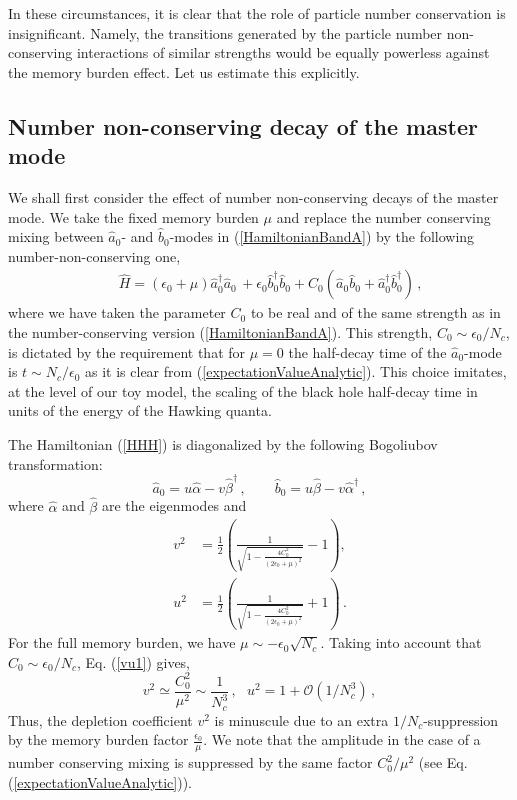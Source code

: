 \documentclass[aps,prd,reprint,superscriptaddress,nofootinbib]{revtex4-2}
\makeatletter
\newcommand*{\Eq}{Eq.\@\xspace}
\makeatother
\begin{document}
In these circumstances, it is clear that the role of 
particle number conservation is insignificant. 
Namely, the transitions generated by the 
particle number non-conserving interactions of similar strengths 
would be equally 
powerless against the memory burden effect.  Let us
estimate this explicitly. \\

\subsection{Number non-conserving decay of the master mode} 

We shall first consider the effect of number non-conserving decays 
of the master mode. 
We take the fixed memory burden $\mu$ and replace the 
number conserving mixing between 
$\hat{a}_0$- and $\hat{b}_0$-modes in (\ref{HamiltonianBandA}) by the following 
number-non-conserving one,   
\begin{eqnarray}  \label{HHH} 
&&\hat{H}  = 
(\epsilon_0 + \mu) \hat{a}^{\dagger}_0 \hat{a}_0  \, + 
\epsilon_0 \hat{b}^{\dagger}_0 \hat{b}_0  + 
C_0 (\hat{a}_0 \hat{b}_0  + \hat{a}_0^{\dagger} \hat{b}_0^{\dagger})\, , 
\end{eqnarray}
where we have taken the parameter $C_0$ to be 
real and of the same strength as in the number-conserving version
(\ref{HamiltonianBandA}).  This strength, 
$C_0 \sim \epsilon_0/N_c$, is dictated by the requirement 
that for $\mu=0$ the half-decay time of the $\hat{a}_0$-mode is 
$t \sim N_c/\epsilon_0$  as it is clear from (\ref{expectationValueAnalytic}). 
This choice imitates, at the level of our toy model,  the scaling of the black hole  half-decay time  in units of the energy of the Hawking quanta.

The Hamiltonian (\ref{HHH}) is diagonalized by the following Bogoliubov transformation:
\begin{equation} 
\hat{a}_0 = u \hat{\alpha} - v \hat{\beta}^{\dagger} \,, \qquad 
\hat{b}_0 =  u \hat{\beta} - v \hat{\alpha}^{\dagger}  \,,   
\end{equation} 
where $\hat{\alpha}$ and $\hat{\beta}$ are the eigenmodes and 
\begin{align} \label{vu1}
v^2 &= \frac{1}{2} \left (\frac{1}{\sqrt{1 - \frac{4C_0^2}{(2\epsilon_0 
+ \mu)^2}}}- 1\right), \\
 u^2 &= \frac{1}{2} \left (\frac{1}{\sqrt{1 - \frac{4C_0^2}{(2\epsilon_0 + \mu)^2}}} +  1\right)\,.
\end{align} 
For the full memory burden, we have $\mu \sim -\epsilon_0 \sqrt{N_c}$. 
Taking into account that $C_0 \sim \epsilon_0/N_c$, \Eq
(\ref{vu1}) gives,  
\begin{equation} 
v^2 \simeq  \frac{C_0^2}{\mu^2} \sim  
\frac{1}{N_c^3}\,, ~~~
u^2 = 1 + {\mathcal O}(1/N_c^3)\,,  \label{depletionMasterMode}
\end{equation} 
Thus, the depletion coefficient $v^2$ is minuscule due to an extra 
$1/N_c$-suppression by the memory burden factor $\frac{\epsilon_0}{\mu}$.
 We note that the amplitude in
	the case of a number conserving mixing is suppressed by the same factor $C_0^2/\mu^2$ (see \Eq (\ref{expectationValueAnalytic})).
\end{document}

